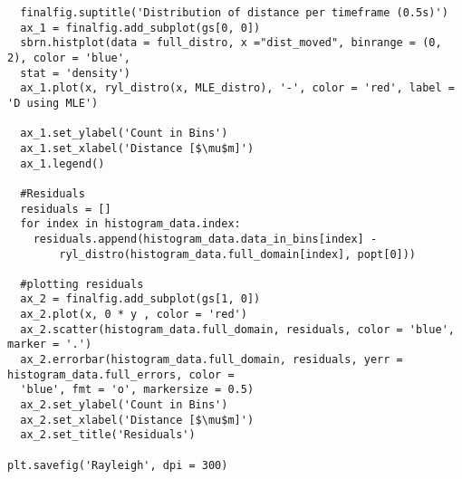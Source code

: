\documentclass[12pt, letterpaper, twoside]{article}
\begin{document}
\begin{verbatim}
  finalfig.suptitle('Distribution of distance per timeframe (0.5s)')
  ax_1 = finalfig.add_subplot(gs[0, 0])
  sbrn.histplot(data = full_distro, x ="dist_moved", binrange = (0, 2), color = 'blue',
  stat = 'density')
  ax_1.plot(x, ryl_distro(x, MLE_distro), '-', color = 'red', label = 'D using MLE')

  ax_1.set_ylabel('Count in Bins')
  ax_1.set_xlabel('Distance [$\mu$m]')
  ax_1.legend()

  #Residuals
  residuals = []
  for index in histogram_data.index:
    residuals.append(histogram_data.data_in_bins[index] - 
        ryl_distro(histogram_data.full_domain[index], popt[0]))

  #plotting residuals
  ax_2 = finalfig.add_subplot(gs[1, 0])
  ax_2.plot(x, 0 * y , color = 'red')
  ax_2.scatter(histogram_data.full_domain, residuals, color = 'blue', marker = '.')
  ax_2.errorbar(histogram_data.full_domain, residuals, yerr = histogram_data.full_errors, color =
  'blue', fmt = 'o', markersize = 0.5)
  ax_2.set_ylabel('Count in Bins')
  ax_2.set_xlabel('Distance [$\mu$m]')
  ax_2.set_title('Residuals')

plt.savefig('Rayleigh', dpi = 300)
\end{verbatim}
\end{document}
